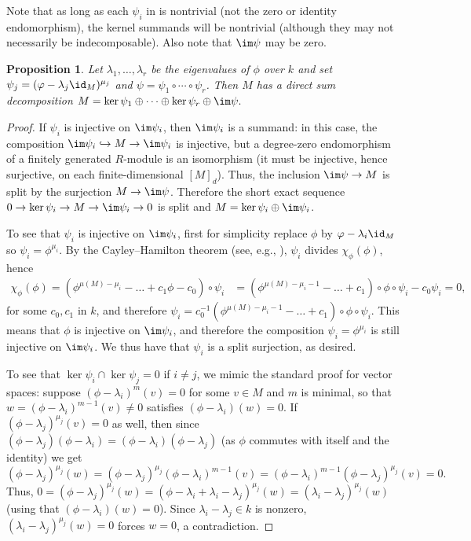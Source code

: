 \documentclass[12pt]{article}
\theoremstyle{theorem}
\numberwithin{thm}{section}
\newtheorem{prop}[thm]{Proposition}
\theoremstyle{definition}
\begin{document}
Note that as long as each $\psi_i$ in  is nontrivial (not the zero or identity endomorphism), the kernel summands will be nontrivial (although they may not necessarily be indecomposable). Also note that $\im\psi$ may be zero.

\begin{prop}\label{prop:split-surj}
  Let $\lambda_1,\dots,\lambda_r$ be the eigenvalues of $\phi$ over $k$ and set $\psi_j = (\phi - \lambda_j\id_M)^{\mu_j}$ and $\psi = \psi_1\circ\cdots\circ\psi_r$. Then $M$ has a direct sum decomposition
  \( M = \ker\psi_1 \oplus \cdots \oplus \ker\psi_r \oplus \im\psi. \)
\end{prop}
\begin{proof}
  If $\psi_i$ is injective on $\im\psi_i$, then $\im\psi_i$ is a summand: in this case, the composition $\im\psi_i\hookrightarrow M\to \im\psi_i$ is injective, but a degree-zero endomorphism of a finitely generated $R$-module is an isomorphism (it must be injective, hence surjective, on each finite-dimensional $[M]_d$). Thus, the inclusion $\im \psi \to M$ is split by the surjection $M\to \im \psi$. Therefore the short exact sequence $0\to\ker\psi_i\to M\to\im\psi_i\to 0$ is split and $M = \ker\psi_i\oplus\im\psi_i$.

  To see that $\psi_i$ is injective on $\im\psi_i$, first for simplicity replace $\phi$ by $\phi-\lambda_i\id_M$ so $\psi_i = \phi^{\mu_i}$. By the Cayley--Hamilton theorem (see, e.g., \cite[Theorem~4.3]{Eisenbud95}), $\psi_i$ divides $\chi_\phi(\phi)$, hence
  \begin{align*}
    \chi_\phi(\phi) = \left(\phi^{\mu(M) - \mu_i} - \dots + c_1\phi - c_0\right) \circ \psi_i
    &= \left(\phi^{\mu(M) - \mu_i - 1} - \dots + c_1\right) \circ \phi \circ \psi_i - c_0 \psi_i = 0,
  \end{align*}
  for some $c_0,c_1$ in $k$, and therefore
  \( \psi_i = c_0^{-1} \left(\phi^{\mu(M) - \mu_i - 1} - \dots + c_1\right) \circ \phi \circ \psi_i. \)
  This means that $\phi$ is injective on $\im\psi_i$, and therefore the composition $\psi_i=\phi^{\mu_i}$ is still injective on $\im\psi_i$.
We thus have that $\psi_i$ is a split surjection, as desired.

  To see that $\ker\psi_i\cap\ker\psi_j = 0$ if $i\neq j$, we mimic the standard proof for vector spaces: suppose $(\phi - \lambda_i)^m(v) = 0$ for some $v\in M$ and $m$ is minimal, so that $w = (\phi-\lambda_i)^{m-1}(v) \neq 0$ satisfies $(\phi-\lambda_i)(w) = 0$. 
If $(\phi - \lambda_j)^{\mu_j}(v) = 0$ as well, then since $(\phi - \lambda_j)(\phi - \lambda_i) = (\phi - \lambda_i)(\phi - \lambda_j)$ (as $\phi$ commutes with itself and the identity) we get
  \[
  (\phi - \lambda_j)^{\mu_j}(w)
  = (\phi - \lambda_j)^{\mu_j}(\phi - \lambda_i)^{m-1}(v)
  = (\phi - \lambda_i)^{m-1}(\phi - \lambda_j)^{\mu_j}(v) = 0.
  \]
Thus,
  \(
  0 = (\phi - \lambda_j)^{\mu_j}(w) = (\phi - \lambda_i + \lambda_i - \lambda_j)^{\mu_j}(w) = (\lambda_i - \lambda_j)^{\mu_j}(w)
  \)
(using that $(\phi - \lambda_i)(w)=0$).
Since $\lambda_i-\lambda_j \in k$ is nonzero, 
$(\lambda_i - \lambda_j)^{\mu_j}(w)= 0 $ forces $w=0$, a contradiction.


\end{proof}
\end{document}

